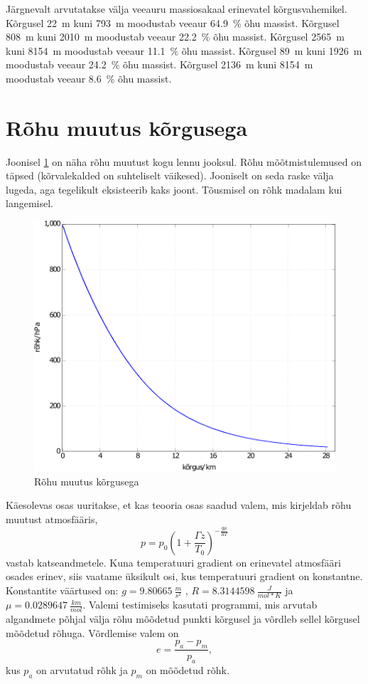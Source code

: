\documentclass{trkut}%
\begin{document}
Järgnevalt arvutatakse välja veeauru massiosakaal erinevatel kõrgusvahemikel. Kõrgusel \SI{22}{m} kuni \SI{793}{m} moodustab veeaur \SI{64.9}{\percent} õhu massist. Kõrgusel \SI{808}{m} kuni \SI{2010}{m} moodustab veeaur \SI{22.2}{\percent} õhu massist. Kõrgusel \SI{2565}{m} kuni \SI{8154}{m} moodustab veeaur \SI{11.1}{\percent} õhu massist. Kõrgusel \SI{89}{m} kuni \SI{1926}{m} moodustab veeaur \SI{24.2}{\percent} õhu massist. Kõrgusel \SI{2136}{m} kuni \SI{8154}{m} moodustab veeaur \SI{8.6}{\percent} õhu massist.


\section{Rõhu muutus kõrgusega}
Joonisel \ref{prekõrg} on näha rõhu muutust kogu lennu jooksul. Rõhu mõõtmistulemused on täpsed (kõrvalekalded on suhteliselt väikesed). Jooniselt on seda raske välja lugeda, aga tegelikult eksisteerib kaks joont. Tõusmisel on rõhk madalam kui langemisel.
\begin{figure}[h]
	\includegraphics[width=1\textwidth]{PicGra/prekõrg.pdf}
	\caption{Rõhu muutus kõrgusega}
	\label{prekõrg}%
\end{figure}

Käesolevas osas uuritakse, et kas teooria osas saadud valem, mis kirjeldab rõhu muutust atmosfääris,
\begin{equation}\label{eq14}
p = p_0 \left(1+\frac{\Gamma z}{T_0}\right)^{-\frac{g\mu}{R\Gamma}}
\end{equation}
vastab katseandmetele. Kuna temperatuuri gradient on erinevatel atmosfääri osades erinev, siis vaatame üksikult osi, kus temperatuuri gradient on konstantne. Konstantite väärtused on: $g = \SI{9.80665}{\frac{m}{s^2}}$ , $R = \SI{8.3144598}{\frac{J}{mol*K}}$ ja $\mu = \SI{0.0289647}{\frac{km}{mol}}$. Valemi testimiseks kasutati programmi, mis arvutab algandmete põhjal välja rõhu mõõdetud punkti kõrgusel ja võrdleb sellel kõrgusel mõõdetud rõhuga. Võrdlemise valem on
\begin{equation}
e = \frac{p_a-p_m}{p_a},
\end{equation}
kus $p_a$ on arvutatud rõhk ja $p_m$ on mõõdetud rõhk.
\end{document}
